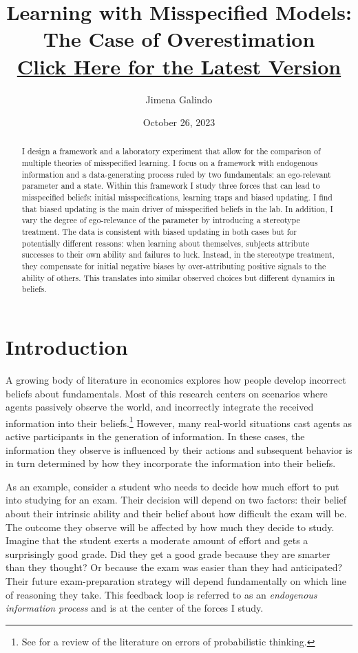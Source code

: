 \documentclass[
  12pt,
]{article}
\title{Learning with Misspecified Models: The Case of Overestimation\\
\href{https://jimena-galindo.github.io/fileRepo/draft.pdf}{\normalsize Click Here for the Latest Version}}
\author{Jimena Galindo}
\date{October 26, 2023}
\begin{document}
\maketitle
\begin{abstract}
I design a framework and a laboratory experiment that allow for the
comparison of multiple theories of misspecified learning. I focus on a
framework with endogenous information and a data-generating process
ruled by two fundamentals: an ego-relevant parameter and a state. Within
this framework I study three forces that can lead to misspecified
beliefs: initial misspecifications, learning traps and biased updating.
I find that biased updating is the main driver of misspecified beliefs
in the lab. In addition, I vary the degree of ego-relevance of the
parameter by introducing a stereotype treatment. The data is consistent
with biased updating in both cases but for potentially different
reasons: when learning about themselves, subjects attribute successes to
their own ability and failures to luck. Instead, in the stereotype
treatment, they compensate for initial negative biases by
over-attributing positive signals to the ability of others. This
translates into similar observed choices but different dynamics in
beliefs.
\end{abstract}

\newpage

\hypertarget{introduction}{%
\section{Introduction}\label{introduction}}

A growing body of literature in economics explores how people develop
incorrect beliefs about fundamentals. Most of this research centers on
scenarios where agents passively observe the world, and incorrectly
integrate the received information into their
beliefs.\footnote{See \citet{benjamin2019} for a review of the literature on errors of probabilistic thinking.}
However, many real-world situations cast agents as active participants
in the generation of information. In these cases, the information they
observe is influenced by their actions and subsequent behavior is in
turn determined by how they incorporate the information into their
beliefs.

As an example, consider a student who needs to decide how much effort to
put into studying for an exam. Their decision will depend on two
factors: their belief about their intrinsic ability and their belief
about how difficult the exam will be. The outcome they observe will be
affected by how much they decide to study. Imagine that the student
exerts a moderate amount of effort and gets a surprisingly good grade.
Did they get a good grade because they are smarter than they thought? Or
because the exam was easier than they had anticipated? Their future
exam-preparation strategy will depend fundamentally on which line of
reasoning they take. This feedback loop is referred to as an
\emph{endogenous information process} and is at the center of the forces
I study.
\end{document}
